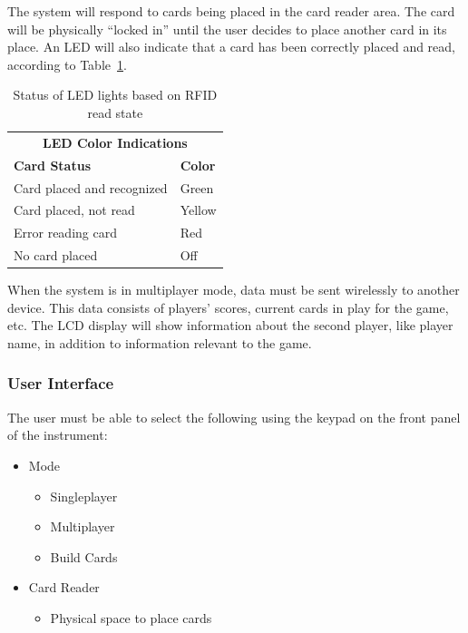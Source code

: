 \documentclass[12pt]{article} %
\begin{document}
The system will respond to cards being placed in the card reader area.  The card will be physically “locked in” until the user decides to place another card in its place.  An LED will also indicate that a card has been correctly placed and read, according to Table~\ref{Tab:LEDTable}.

\begin{table}[h]
	\begin{tabular}{ll}
		\multicolumn{2}{c}{\textbf{LED Color Indications}} \\
		\textbf{Card Status}           & \textbf{Color}    \\
		Card placed and recognized     & Green             \\
		Card placed, not read          & Yellow            \\
		Error reading card             & Red               \\
		No card placed                 & Off              
	\end{tabular}
	\caption{Status of LED lights based on RFID read state}
	\label{Tab:LEDTable}
\end{table}

When the system is in multiplayer mode, data must be sent wirelessly to another device. This data consists of players’ scores, current cards in play for the game, etc.  The LCD display will show information about the second player, like player name, in addition to information relevant to the game. 

\subsubsection{User Interface}\label{UI}

The user must be able to select the following using the keypad on the front panel of the instrument:

\begin{itemize}
	\item Mode
		\begin{itemize}
			\item Singleplayer
			\item Multiplayer
			\item Build Cards
		\end{itemize}
	\item Card Reader
		\begin{itemize}
			\item Physical space to place cards
		\end{itemize}
\end{itemize}
\end{document}
